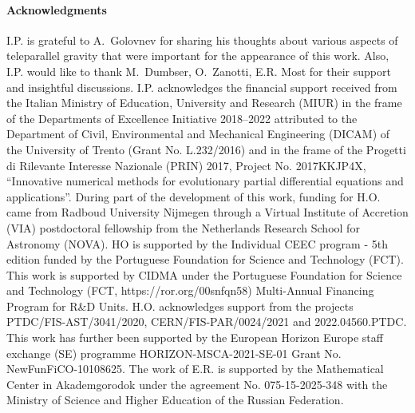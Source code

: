 \documentclass[
10pt, %
a4paper, %
oneside, %
twocolumn,
headinclude,footinclude, %
BCOR5mm, %
]{scrartcl}
\begin{document}
	\paragraph{Acknowledgments}
	I.P. is grateful to A.~Golovnev for sharing his thoughts about various
	aspects of teleparallel gravity that were important for the appearance of
	this work. Also, I.P. would like to thank M.~Dumbser, O.~Zanotti, E.R. Most
	for their support and insightful discussions. I.P. acknowledges the
	financial support received from the Italian Ministry of Education,
	University and Research (MIUR) in the frame of the Departments of Excellence
	Initiative 2018–2022 attributed to the Department of Civil, Environmental
	and Mechanical Engineering (DICAM) of the University of Trento (Grant No.
	L.232/2016) and in the frame of the Progetti di Rilevante Interesse
	Nazionale (PRIN) 2017, Project No. 2017KKJP4X, “Innovative numerical methods
	for evolutionary partial differential equations and applications”.
	During part of the development of this work,
	funding for H.O. came from Radboud University Nijmegen through a Virtual
	Institute of Accretion (VIA) postdoctoral fellowship from the Netherlands
	Research School for Astronomy (NOVA).
	HO is supported by the Individual CEEC program - 5th edition funded by the Portuguese Foundation for Science and Technology (FCT).
	This work is supported by CIDMA under the
	Portuguese Foundation for Science and Technology 
	(FCT, https://ror.org/00snfqn58)  
	Multi-Annual Financing Program for R\&D Units.
	H.O. acknowledges support from the projects PTDC/FIS-AST/3041/2020, CERN/FIS-PAR/0024/2021 and 2022.04560.PTDC. This work has further been supported by the European Horizon Europe staff exchange (SE) programme HORIZON-MSCA-2021-SE-01 Grant No. NewFunFiCO-10108625.
	The work of E.R. is supported by the Mathematical Center in Akademgorodok
	under the agreement No. 075-15-2025-348 with the Ministry of Science and
	Higher Education of the Russian Federation.
	
	
	\appendix
	
\end{document}
